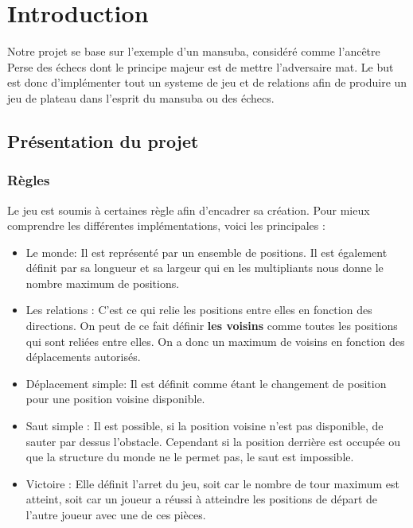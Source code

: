\chapter{Introduction}
Notre projet se base sur l'exemple d'un mansuba, considéré comme l'ancêtre Perse des échecs dont le principe majeur est de mettre l'adversaire mat. Le but est donc d'implémenter tout un systeme de jeu et de relations afin de produire un jeu de plateau dans l'esprit du mansuba ou des échecs.


\section{Présentation du projet}
\subsection{Règles}
    Le jeu est soumis à certaines règle afin d'encadrer sa création. Pour mieux comprendre les différentes implémentations, voici les principales : \\
    \begin{itemize}
        \item[\textdagger] Le monde: Il est représenté par un ensemble de positions. Il est également définit par sa longueur et sa largeur qui en les multipliants nous donne le nombre maximum de positions.\\
        
        \item[\textdagger] Les relations : C'est ce qui relie les positions entre elles en fonction des directions. On peut de ce fait définir \textbf{les voisins} comme toutes les positions qui sont reliées entre elles. On a donc un maximum de voisins en fonction des déplacements autorisés.
        \\
        \item[\textdagger] Déplacement simple: Il est définit comme étant le changement de position pour une position voisine disponible.
        \\
        \item[\textdagger] Saut simple : Il est possible, si la position voisine n'est pas disponible, de sauter par dessus l'obstacle. Cependant si la position derrière est occupée ou que la structure du monde ne le permet pas, le saut est impossible.
        \\
        \item[\textdagger] Victoire : Elle définit l'arret du jeu, soit car le nombre de tour maximum est atteint, soit car un joueur a réussi à atteindre les positions de départ de l'autre joueur avec une de ces pièces.
        \\
    \end{itemize}
